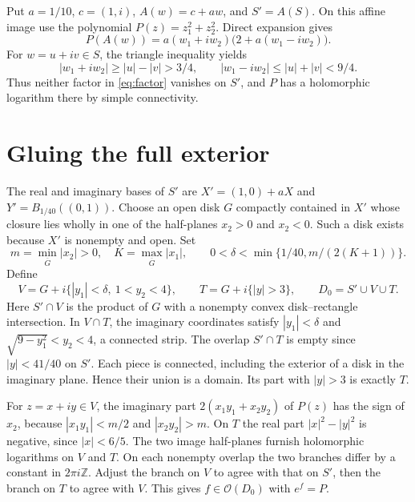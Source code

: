 \documentclass[11pt]{amsart}
\begin{document}
Put \(a=1/10\), \(c=(1,i)\), \(A(w)=c+aw\), and \(S'=A(S)\). On this affine image use the polynomial \(P(z)=z_1^2+z_2^2\). Direct expansion gives
\begin{equation}\label{eq:factor}
 P(A(w))=a(w_1+iw_2)\bigl(2+a(w_1-iw_2)\bigr).
\end{equation}
For \(w=u+iv\in S\), the triangle inequality yields
\[
 |w_1+iw_2|\ge |u|-|v|>3/4,\qquad
 |w_1-iw_2|\le |u|+|v|<9/4.
\]
Thus neither factor in \eqref{eq:factor} vanishes on \(S'\), and \(P\) has a holomorphic logarithm there by simple connectivity.

\section{Gluing the full exterior}
The real and imaginary bases of \(S'\) are \(X'=(1,0)+aX\) and \(Y'=B_{1/40}((0,1))\). Choose an open disk \(G\) compactly contained in \(X'\) whose closure lies wholly in one of the half-planes \(x_2>0\) and \(x_2<0\). Such a disk exists because \(X'\) is nonempty and open. Set
\[
 m=\min_{\overline G}|x_2|>0,\quad K=\max_{\overline G}|x_1|,
 \qquad 0<\delta<\min\{1/40,m/(2(K+1))\}.
\]
Define
\[
 V=G+i\{|y_1|<\delta,\ 1<y_2<4\},\qquad
 T=G+i\{|y|>3\},\qquad D_0=S'\cup V\cup T.
\]
Here \(S'\cap V\) is the product of \(G\) with a nonempty convex disk--rectangle intersection. In \(V\cap T\), the imaginary coordinates satisfy \(|y_1|<\delta\) and \(\sqrt{9-y_1^2}<y_2<4\), a connected strip. The overlap \(S'\cap T\) is empty since \(|y|<41/40\) on \(S'\). Each piece is connected, including the exterior of a disk in the imaginary plane. Hence their union is a domain. Its part with \(|y|>3\) is exactly \(T\).

For \(z=x+iy\in V\), the imaginary part \(2(x_1y_1+x_2y_2)\) of \(P(z)\) has the sign of \(x_2\), because \(|x_1y_1|<m/2\) and \(|x_2y_2|>m\). On \(T\) the real part \(|x|^2-|y|^2\) is negative, since \(|x|<6/5\). The two image half-planes furnish holomorphic logarithms on \(V\) and \(T\). On each nonempty overlap the two branches differ by a constant in \(2\pi i\mathbb Z\). Adjust the branch on \(V\) to agree with that on \(S'\), then the branch on \(T\) to agree with \(V\). This gives \(f\in\mathcal O(D_0)\) with \(e^f=P\).
\end{document}
